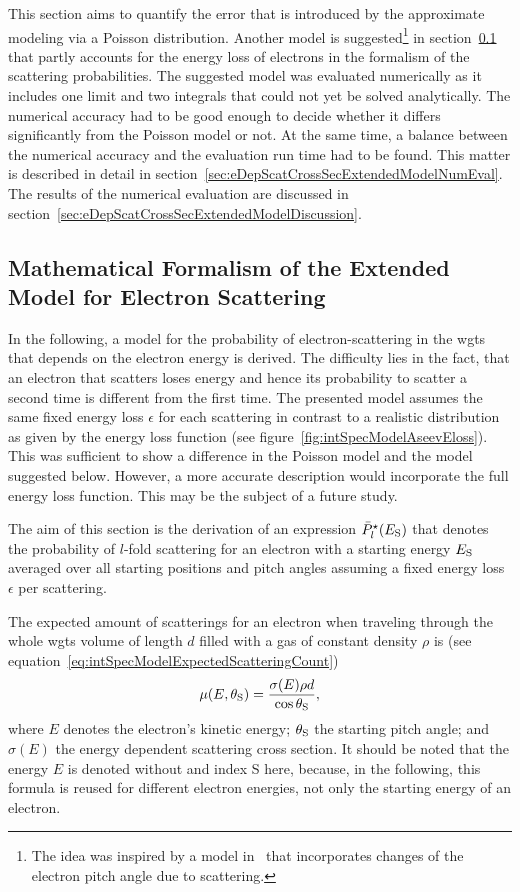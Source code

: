 This section aims to quantify the error that is introduced by the approximate modeling via a Poisson distribution. Another model is suggested\footnote{The idea was inspired by a model in~\cite{Groh2015} that incorporates changes of the electron pitch angle due to scattering.} in section~\ref{sec:eDepScatCrossSecExtendedModelFormalism} that partly accounts for the energy loss of electrons in the formalism of the scattering probabilities. The suggested model was evaluated numerically as it includes one limit and two integrals that could not yet be solved analytically. The numerical accuracy had to be good enough to decide whether it differs significantly from the Poisson model or not. At the same time, a balance between the numerical accuracy and the evaluation run time had to be found. This matter is described in detail in section~\ref{sec:eDepScatCrossSecExtendedModelNumEval}. The results of the numerical evaluation are discussed in section~\ref{sec:eDepScatCrossSecExtendedModelDiscussion}.

\subsection{Mathematical Formalism of the Extended Model for Electron Scattering}
\label{sec:eDepScatCrossSecExtendedModelFormalism}
In the following, a model for the probability of electron-scattering in the \gls{wgts} that depends on the electron energy is derived. The difficulty lies in the fact, that an electron that scatters loses energy and hence its probability to scatter a second time is different from the first time. The presented model assumes the same fixed energy loss $\epsilon$ for each scattering in contrast to a realistic distribution as given by the energy loss function (see figure~\ref{fig:intSpecModelAseevEloss}). This was sufficient to show a difference in the Poisson model and the model suggested below. However, a more accurate description would incorporate the full energy loss function. This may be the subject of a future study. 

The aim of this section is the derivation of an expression $\bar{P}^{\star}_l(E_\mathrm{S})$ that denotes the probability of $l$-fold scattering for an electron with a starting energy $E_\mathrm{S}$ averaged over all starting positions and pitch angles assuming a fixed energy loss $\epsilon$ per scattering.

The expected amount of scatterings for an electron when traveling through the whole \gls{wgts} volume of length $d$ filled with a gas of constant density $\rho$ is (see equation~\ref{eq:intSpecModelExpectedScatteringCount})
\begin{equation}
\label{eq:eDepScatCrossSecExtendedModelFormalismExpectedScatCount}
\mu(E,\theta_\mathrm{S}) =
\frac{\sigma(E)\rho d}{\cos\theta_\mathrm{S}},
\end{equation}
where $E$ denotes the electron's kinetic energy; $\theta_\mathrm{S}$ the starting pitch angle; and $\sigma(E)$ the energy dependent scattering cross section. It should be noted that the energy $E$ is denoted without and index S here, because, in the following, this formula is reused for different electron energies, not only the starting energy of an electron.

